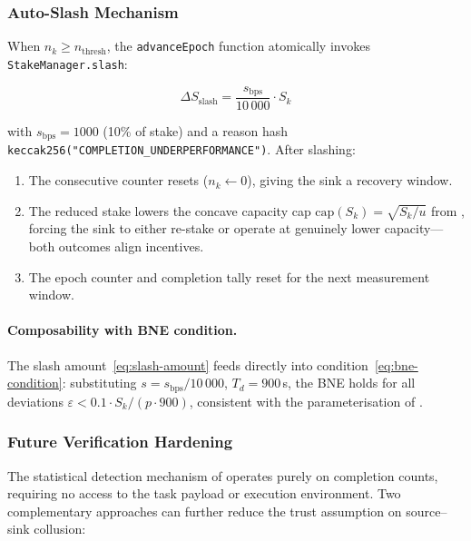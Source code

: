 \subsubsection{Auto-Slash Mechanism}

When $n_k \geq n_{\mathrm{thresh}}$, the \texttt{advanceEpoch} function
atomically invokes \texttt{StakeManager.slash}:

\begin{equation}
\label{eq:slash-amount}
\Delta S_{\mathrm{slash}} = \frac{s_{\mathrm{bps}}}{10\,000} \cdot S_k
\end{equation}

\noindent with $s_{\mathrm{bps}} = 1000$ (10\% of stake) and a reason hash
\texttt{keccak256("COMPLETION\_UNDERPERFORMANCE")}.
After slashing:

\begin{enumerate}
  \item The consecutive counter resets ($n_k \gets 0$), giving the sink a
        recovery window.
  \item The reduced stake lowers the concave capacity cap
        $\text{cap}(S_k) = \sqrt{S_k / u}$ from ,
        forcing the sink to either re-stake or operate at genuinely lower
        capacity---both outcomes align incentives.
  \item The epoch counter and completion tally reset for the next measurement
        window.
\end{enumerate}

\paragraph{Composability with BNE condition.}
The slash amount~\eqref{eq:slash-amount} feeds directly into
condition~\eqref{eq:bne-condition}: substituting $s = s_{\mathrm{bps}} / 10\,000$,
$T_d = 900$\,s, the BNE holds for all deviations
$\varepsilon < 0.1 \cdot S_k / (p \cdot 900)$, consistent with the
parameterisation of .

\subsubsection{Future Verification Hardening}
\label{sec:future-verification}

The statistical detection mechanism of  operates purely
on completion counts, requiring no access to the task payload or execution
environment.  Two complementary approaches can further reduce the trust
assumption on source--sink collusion:

